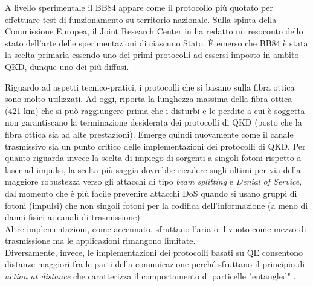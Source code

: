 A livello sperimentale il BB84 appare come il protocollo più quotato per effettuare test di funzionamento su territorio nazionale. Sulla spinta della Commissione Europea, il Joint Research Center in \cite{in_field_implementations} ha redatto un resoconto dello stato dell'arte delle sperimentazioni di ciascuno Stato. È emerso che BB84 è stata la scelta primaria essendo uno dei primi protocolli ad essersi imposto in ambito QKD, dunque uno dei più diffusi. 

Riguardo ad aspetti tecnico-pratici, i protocolli che si basano sulla fibra ottica sono molto utilizzati. Ad oggi, \cite{fibre421} riporta la lunghezza massima della fibra ottica (421 km) che si può raggiungere prima che i disturbi e le perdite a cui è soggetta non garantiscano la terminazione desiderata dei protocolli di QKD (posto che la fibra ottica sia ad alte prestazioni). Emerge quindi nuovamente come il canale trasmissivo sia un punto critico delle implementazioni dei protocolli di QKD. Per quanto riguarda invece la scelta di impiego di sorgenti a singoli fotoni rispetto a laser ad impulsi, la scelta più saggia dovrebbe ricadere sugli ultimi per via della maggiore robustezza verso gli attacchi di tipo \textit{beam splitting} e \textit{Denial of Service}, dal momento che è più facile prevenire attacchi DoS quando si usano gruppi di fotoni (impulsi) che non singoli fotoni per la codifica dell'informazione (a meno di danni fisici ai canali di trasmissione).\\
Altre implementazioni, come accennato, sfruttano l'aria o il vuoto come mezzo di trasmissione \cite{knight} ma le applicazioni rimangono limitate.\\
Diversamente, invece, le implementazioni dei protocolli basati su QE consentono distanze maggiori fra le parti della comunicazione perché sfruttano il principio di \textit{action at distance} che caratterizza il comportamento di particelle "entangled" \cite{ent_impl}.